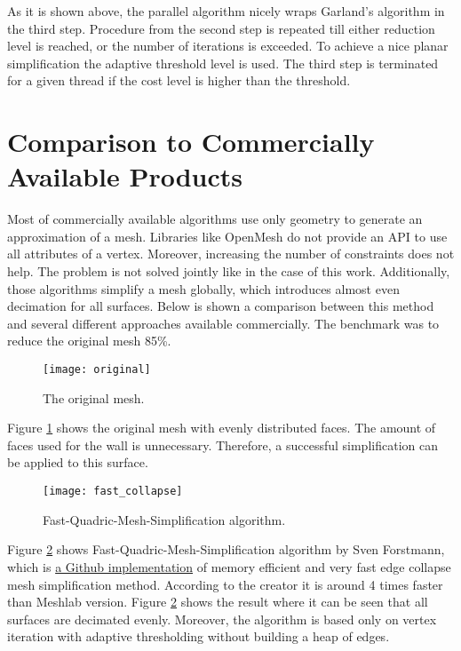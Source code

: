 As it is shown above, the parallel algorithm nicely wraps Garland's algorithm in the third step. Procedure from the second step is repeated till either reduction level is reached, or the number of iterations is exceeded. To achieve a nice planar simplification the adaptive threshold level is used. The third step is terminated for a given thread if the cost level is higher than the threshold.

\newpage
\section{Comparison to Commercially Available Products}

Most of commercially available algorithms use only geometry to generate an approximation of a mesh. Libraries like OpenMesh do not provide an API to use all attributes of a vertex. Moreover, increasing the number of constraints does not help. The problem is not solved jointly like in the case of this work. Additionally, those algorithms simplify a mesh globally, which introduces almost even decimation for all surfaces. Below is shown a comparison between this method and several different approaches available commercially. The benchmark was to reduce the original mesh 85\%.

\begin{figure}[H]
  \begin{center}
    \texttt{[image: original]}
    \caption{The original mesh.}
    \label{fig:original}
  \end{center}
\end{figure}

Figure \ref{fig:original} shows the original mesh with evenly distributed faces. The amount of faces used for the wall is unnecessary. Therefore, a successful simplification can be applied to this surface.

\begin{figure}[H]
  \begin{center}
    \texttt{[image: fast\_collapse]}
    \caption{Fast-Quadric-Mesh-Simplification algorithm.}
    \label{fig:fast_collapse}
  \end{center}
\end{figure}

Figure \ref{fig:fast_collapse} shows Fast-Quadric-Mesh-Simplification algorithm by Sven Forstmann, which is \href{https://github.com/sp4cerat/Fast-Quadric-Mesh-Simplification}{a Github implementation} of memory efficient and very fast edge collapse mesh simplification method. According to the creator it is around 4 times faster than Meshlab version. Figure \ref{fig:fast_collapse} shows the result where it can be seen that all surfaces are decimated evenly. Moreover, the algorithm is based only on vertex iteration with adaptive thresholding without building a heap of edges.

